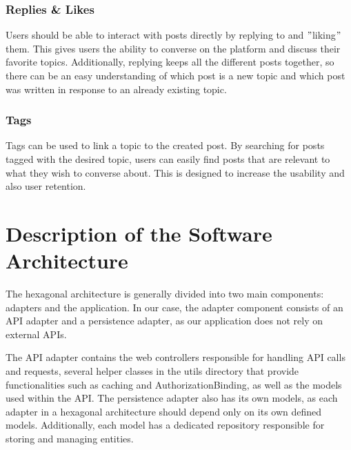 \documentclass[a4paper, 11pt]{article}
\begin{document}
    \subsubsection{Replies \& Likes}
    Users should be able to interact with posts directly by replying to and \("\)liking\("\) them. This gives users the ability to converse on the platform and discuss their favorite topics. Additionally, replying keeps all the different posts together, so there can be an easy understanding of which post is a new topic and which post was written in response to an already existing topic.

    \subsubsection{Tags}
    Tags can be used to link a topic to the created post. By searching for posts tagged with the desired topic, users can easily find posts that are relevant to what they wish to converse about. This is designed to increase the usability and also user retention.




    \section{Description of the Software Architecture}\label{sec:description-of-the-software-architecture}
The hexagonal architecture is generally divided into two main components: adapters and the application. In our case, the adapter component consists of an API adapter and a persistence adapter, as our application does not rely on external APIs.

The API adapter contains the web controllers responsible for handling API calls and requests, several helper classes in the utils directory that provide functionalities such as caching and AuthorizationBinding, as well as the models used within the API. The persistence adapter also has its own models, as each adapter in a hexagonal architecture should depend only on its own defined models. Additionally, each model has a dedicated repository responsible for storing and managing entities.
\end{document}
